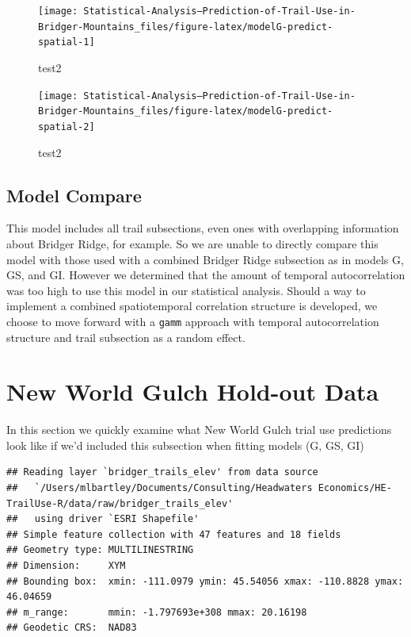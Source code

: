 \documentclass[
]{book}
\begin{document}
\begin{figure}

{\centering \texttt{[image: Statistical-Analysis--Prediction-of-Trail-Use-in-Bridger-Mountains\_files/figure-latex/modelG-predict-spatial-1]} 

}

\caption{test2}\label{fig:modelG-predict-spatial-1}
\end{figure}
\begin{figure}

{\centering \texttt{[image: Statistical-Analysis--Prediction-of-Trail-Use-in-Bridger-Mountains\_files/figure-latex/modelG-predict-spatial-2]} 

}

\caption{test2}\label{fig:modelG-predict-spatial-2}
\end{figure}

\hypertarget{model-compare}{%
\section{Model Compare}\label{model-compare}}

This model includes all trail subsections, even ones with overlapping information about Bridger Ridge, for example. So we are unable to directly compare this model with those used with a combined Bridger Ridge subsection as in models G, GS, and GI. However we determined that the amount of temporal autocorrelation was too high to use this model in our statistical analysis. Should a way to implement a combined spatiotemporal correlation structure is developed, we choose to move forward with a \texttt{gamm} approach with temporal autocorrelation structure and trail subsection as a random effect.

\hypertarget{new-world-gulch-hold-out-data}{%
\chapter{New World Gulch Hold-out Data}\label{new-world-gulch-hold-out-data}}

In this section we quickly examine what New World Gulch trial use predictions look like if we'd included this subsection when fitting models (G, GS, GI)

\begin{verbatim}
## Reading layer `bridger_trails_elev' from data source 
##   `/Users/mlbartley/Documents/Consulting/Headwaters Economics/HE-TrailUse-R/data/raw/bridger_trails_elev' 
##   using driver `ESRI Shapefile'
## Simple feature collection with 47 features and 18 fields
## Geometry type: MULTILINESTRING
## Dimension:     XYM
## Bounding box:  xmin: -111.0979 ymin: 45.54056 xmax: -110.8828 ymax: 46.04659
## m_range:       mmin: -1.797693e+308 mmax: 20.16198
## Geodetic CRS:  NAD83
\end{verbatim}
\end{document}
